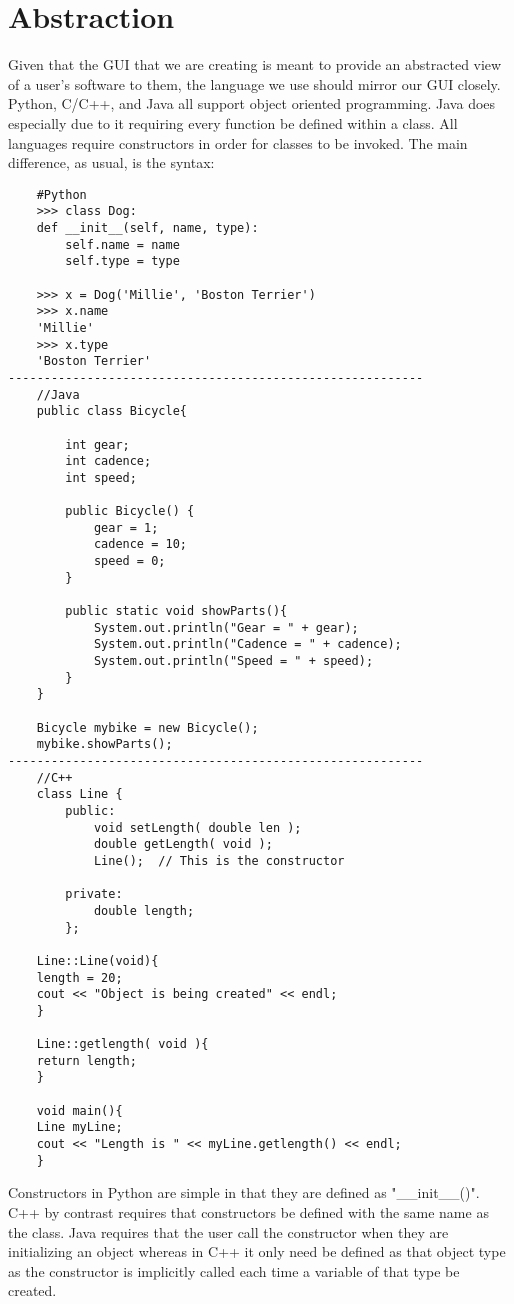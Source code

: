 \documentclass[journal,10pt,onecolumn,compsoc]{IEEEtran} \usepackage[margin=1.0in]{geometry} \usepackage{pdfpages} \usepackage{graphicx}
\begin{document}
\newpage
\section{Abstraction}

Given that the GUI that we are creating is meant to provide an abstracted view of a user's software to them, the language we use should mirror our GUI closely.
Python, C/C++, and Java all support object oriented programming. 
Java does especially due to it requiring every function be defined within a class.
All languages require constructors in order for classes to be invoked. 
The main difference, as usual, is the syntax:

\begin{lstlisting}
	#Python
	>>> class Dog:
	def __init__(self, name, type):
		self.name = name
		self.type = type

	>>> x = Dog('Millie', 'Boston Terrier')
	>>> x.name 
	'Millie'
	>>> x.type
	'Boston Terrier'
----------------------------------------------------------
	//Java
	public class Bicycle{
    	
        int gear;
        int cadence;
        int speed;
        
		public Bicycle() {
			gear = 1;
			cadence = 10;
			speed = 0;
		}
        
		public static void showParts(){
			System.out.println("Gear = " + gear);
			System.out.println("Cadence = " + cadence);
			System.out.println("Speed = " + speed);
		}
	}

	Bicycle mybike = new Bicycle();
    mybike.showParts();
----------------------------------------------------------
	//C++
	class Line {
		public:
			void setLength( double len );
			double getLength( void );
			Line();  // This is the constructor
 
		private:
			double length;
		};
    
	Line::Line(void){
	length = 20;
	cout << "Object is being created" << endl;
	}
    
    Line::getlength( void ){
	return length;
    }
    
    void main(){
	Line myLine;
	cout << "Length is " << myLine.getlength() << endl;
    }
\end{lstlisting}

\noindent Constructors in Python are simple in that they are defined as "\_\_init\_\_()". 
C++ by contrast requires that constructors be defined with the same name as the class. \cite{cclass} 
Java requires that the user call the constructor when they are initializing an object whereas in C++ it only need be defined as that object type as the constructor is implicitly called each time a variable of that type be created. \cite{javaclass} 
\end{document}
